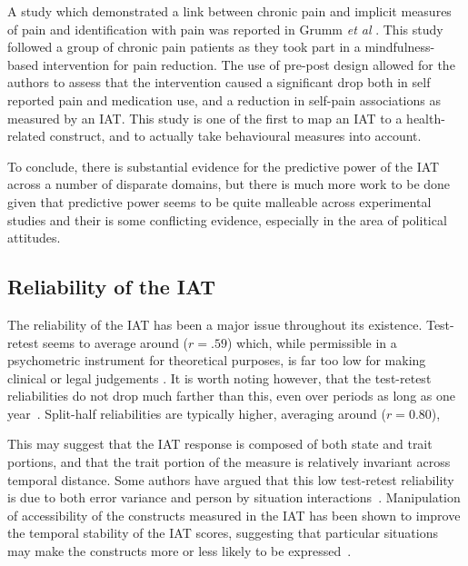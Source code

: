 A study which demonstrated a link between chronic pain and implicit measures of pain and identification with pain was reported in Grumm \textit{et al} \cite{Grumm2008}. This study followed a group of chronic pain patients as they took part in a mindfulness-based intervention for pain reduction. The use of pre-post design allowed for the authors to assess that the intervention caused a significant drop both in self reported pain and medication use, and a reduction in self-pain associations as measured by an IAT. This study is one of the first to map an IAT to a health-related construct, and to actually take behavioural measures into account. 

To conclude, there is substantial evidence for the predictive power of the IAT across a number of disparate domains, but there is much more work to be done given that predictive power seems to be quite malleable across experimental studies and their is some conflicting evidence, especially in the area of political attitudes. 

\subsection{Reliability of the IAT}
\label{sec:reliability-iat}

The reliability of the IAT has been a major issue throughout its existence. Test-retest seems to average around ($r=.59$) which, while permissible in a psychometric instrument for theoretical purposes, is far too low for making clinical or legal judgements \cite{Greenwald2000, Blanton2006d}. It is worth noting however, that the test-retest reliabilities do not drop much farther than this, even over periods as long as one year~\cite{Egloff2005}. 
Split-half reliabilities are typically higher, averaging around ($r=0.80$),  

This may suggest that the IAT response is composed of both state and trait portions, and that the trait portion of the measure is relatively invariant across temporal distance. Some authors have argued that this low test-retest reliability is due to both error variance and person by situation interactions~\cite{Gschwendner2008}.  Manipulation of accessibility of the constructs measured in the IAT has been shown to improve the temporal stability of the IAT scores, suggesting that particular situations may make the constructs more or less likely to be expressed~\cite{Gschwendner2008}. 





